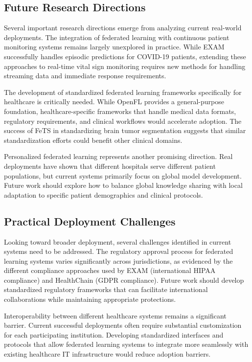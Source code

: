 \documentclass[3p,times,procedia]{elsarticle}
\begin{document}
\subsection{Future Research Directions}

Several important research directions emerge from analyzing current real-world deployments. The integration of federated learning with continuous patient monitoring systems remains largely unexplored in practice. While EXAM successfully handles episodic predictions for COVID-19 patients, extending these approaches to real-time vital sign monitoring requires new methods for handling streaming data and immediate response requirements.

The development of standardized federated learning frameworks specifically for healthcare is critically needed. While OpenFL provides a general-purpose foundation, healthcare-specific frameworks that handle medical data formats, regulatory requirements, and clinical workflows would accelerate adoption. The success of FeTS in standardizing brain tumor segmentation suggests that similar standardization efforts could benefit other clinical domains.

Personalized federated learning represents another promising direction. Real deployments have shown that different hospitals serve different patient populations, but current systems primarily focus on global model development. Future work should explore how to balance global knowledge sharing with local adaptation to specific patient demographics and clinical protocols.

\subsection{Practical Deployment Challenges}

Looking toward broader deployment, several challenges identified in current systems need to be addressed. The regulatory approval process for federated learning systems varies significantly across jurisdictions, as evidenced by the different compliance approaches used by EXAM (international HIPAA compliance) and HealthChain (GDPR compliance). Future work should develop standardized regulatory frameworks that can facilitate international collaborations while maintaining appropriate protections.

Interoperability between different healthcare systems remains a significant barrier. Current successful deployments often require substantial customization for each participating institution. Developing standardized interfaces and protocols that allow federated learning systems to integrate more seamlessly with existing healthcare IT infrastructure would reduce adoption barriers.
\end{document}
